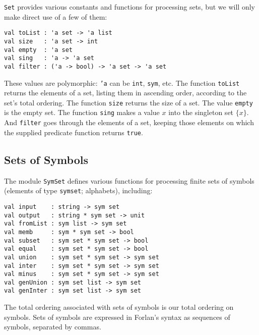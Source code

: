 \texttt{Set} provides various constants and functions for
processing sets, but we will only make direct use of a few of them:
\begin{verbatim}
val toList : 'a set -> 'a list
val size   : 'a set -> int
val empty  : 'a set
val sing   : 'a -> 'a set
val filter : ('a -> bool) -> 'a set -> 'a set
\end{verbatim}
%
%
%
%
%
These values are polymorphic: \texttt{'a} can be \texttt{int},
\texttt{sym}, etc.
The function \texttt{toList} returns the elements of a set, listing
them in ascending order, according to the set's total ordering.
The function \texttt{size} returns the size of a set.
The value \texttt{empty} is the empty set.
The function \texttt{sing} makes a value $x$ into the singleton
set $\{x\}$. And \texttt{filter} goes through the elements of a set,
keeping those elements on which the supplied predicate function
returns \texttt{true}.

\subsection{Sets of Symbols}

The module \texttt{SymSet}
%
defines various functions for processing
finite sets of symbols (elements of type \texttt{sym\;set};
%
alphabets), including:
\begin{verbatim}
val input    : string -> sym set
val output   : string * sym set -> unit
val fromList : sym list -> sym set
val memb     : sym * sym set -> bool
val subset   : sym set * sym set -> bool
val equal    : sym set * sym set -> bool
val union    : sym set * sym set -> sym set
val inter    : sym set * sym set -> sym set
val minus    : sym set * sym set -> sym set
val genUnion : sym set list -> sym set
val genInter : sym set list -> sym set
\end{verbatim}
%
%
%
%
%
%
%
%
%
%
%
The total ordering associated with sets of symbols is our total
ordering on symbols.  Sets of symbols are expressed in Forlan's syntax
as sequences of symbols, separated by commas.


